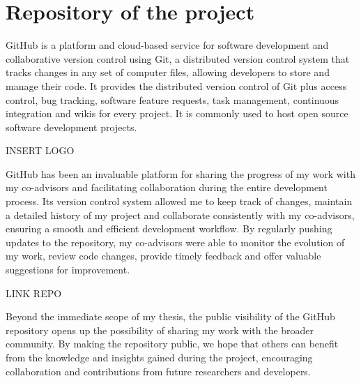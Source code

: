 \section{Repository of the project}

GitHub is a platform and cloud-based service for software development and collaborative version control using Git, a distributed version control system that tracks changes in any set of computer files, allowing developers to store and manage their code. 
It provides the distributed version control of Git plus access control, bug tracking, software feature requests, task management, continuous integration and wikis for every project.
It is commonly used to host open source software development projects.

INSERT LOGO

GitHub has been an invaluable platform for sharing the progress of my work with my co-advisors and facilitating collaboration during the entire development process. 
Its version control system allowed me to keep track of changes, maintain a detailed history of my project and collaborate consistently with my co-advisors, ensuring a smooth and efficient development workflow. 
By regularly pushing updates to the repository, my co-advisors were able to monitor the evolution of my work, review code changes, provide timely feedback and offer valuable suggestions for improvement.

LINK REPO

Beyond the immediate scope of my thesis, the public visibility of the GitHub repository opens up the possibility of sharing my work with the broader community. 
By making the repository public, we hope that others can benefit from the knowledge and insights gained during the project, encouraging collaboration and contributions from future researchers and developers.
